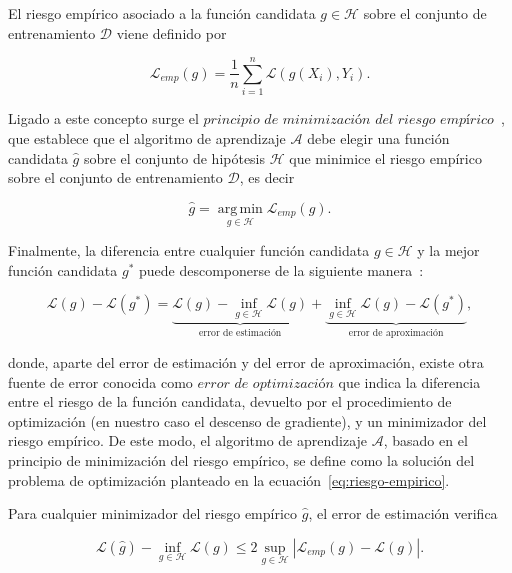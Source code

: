 \begin{definicion}\label{def:riesgo-empírico}
    El riesgo empírico asociado a la función candidata $g \in \mathcal{H}$ sobre el conjunto de entrenamiento $\mathcal{D}$ viene definido por

    \[ \mathcal{L}_{emp}(g) = \frac{1}{n} \sum_{i=1}^{n}\mathcal{L}(g(X_{i}), Y_{i}). \]
\end{definicion}

Ligado a este concepto surge el $\textit{principio de minimización del riesgo empírico}$~\cite{Vapnik1991}, que establece que el algoritmo de aprendizaje $\mathcal{A}$ debe elegir una función candidata $\hat{g}$ sobre el conjunto de hipótesis $\mathcal{H}$ que minimice el riesgo empírico sobre el conjunto de entrenamiento $\mathcal{D}$, es decir

\begin{equation}\label{eq:riesgo-empirico}
    \hat{g} = \operatorname*{\arg \,\min}_{g \in \mathcal{H}} \mathcal{L}_{emp}(g). 
\end{equation}

Finalmente, la diferencia entre cualquier función candidata $g \in \mathcal{H}$ y la mejor función candidata $g^{*}$ puede descomponerse de la siguiente manera~\cite{Lafon2024}:

\[
    \mathcal{L}(g) - \mathcal{L}(g^{*}) = \underbrace{\mathcal{L}(g) - \inf_{g \in \mathcal{H}} \mathcal{L}(g)}_{\text{error de estimación}} + \underbrace{\inf_{g \in \mathcal{H}} \mathcal{L}(g) - \mathcal{L}(g^{*})}_{\text{error de aproximación}},
\]

donde, aparte del error de estimación y del error de aproximación, existe otra fuente de error conocida como $\textit{error de optimización}$ que indica la diferencia entre el riesgo de la función candidata, devuelto por el procedimiento de optimización (en nuestro caso el descenso de gradiente), y un minimizador del riesgo empírico. De este modo, el algoritmo de aprendizaje $\mathcal{A}$, basado en el principio de minimización del riesgo empírico, se define como la solución del problema de optimización planteado en la ecuación~\eqref{eq:riesgo-empirico}.

\begin{proposicion}\label{prop:min-riesgo-empirico}
    Para cualquier minimizador del riesgo empírico $\hat{g}$, el error de estimación verifica

    \[ \mathcal{L}(\hat{g}) - \inf_{g \in \mathcal{H}}\mathcal{L}(g) \leq 2 \sup_{g \in \mathcal{H}}|\mathcal{L}_{emp}(g) - \mathcal{L}(g)|. \]
\end{proposicion}

